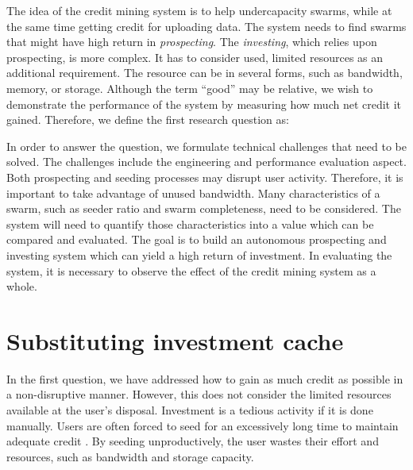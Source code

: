 The idea of the credit mining system is to help undercapacity swarms, while at the same time getting credit for uploading data. The system needs to find swarms that might have high return in \textit{prospecting}. The \textit{investing}, which relies upon prospecting, is more complex. It has to consider used, limited resources as an additional requirement. The resource can be in several forms, such as bandwidth, memory, or storage. Although the term ``good'' may be relative, we wish to demonstrate the performance of the system by measuring how much net credit it gained. Therefore, we define the first research question as:

	
In order to answer the question, we formulate technical challenges that need to be solved. The challenges include the engineering and performance evaluation aspect. Both prospecting and seeding processes may disrupt user activity. Therefore, it is important to take advantage of unused bandwidth. Many characteristics of a swarm, such as seeder ratio and swarm completeness, need to be considered. The system will need to quantify those characteristics into a value which can be compared and evaluated. The goal is to build an autonomous prospecting and investing system which can yield a high return of investment. In evaluating the system, it is necessary to observe the effect of the credit mining system as a whole.

\section{Substituting investment cache}
In the first question, we have addressed how to gain as much credit as possible in a non-disruptive manner. However, this does not consider the limited resources available at the user's disposal. Investment is a tedious activity if it is done manually. Users are often forced to seed for an excessively long time to maintain adequate credit \cite{2013:survivepriv:jia}. By seeding unproductively, the user wastes their effort and resources, such as bandwidth and storage capacity. 


